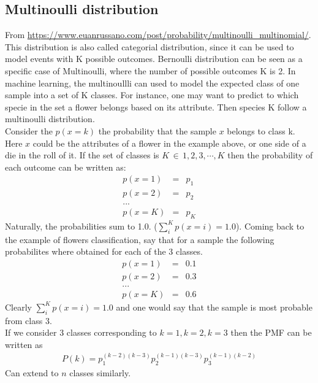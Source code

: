 \documentclass{article}
\newcommand{\ber}{\begin{eqnarray}}
\newcommand{\eer}{\end{eqnarray}}
\begin{document}
\subsection{Multinoulli distribution}
From \url{https://www.euanrussano.com/post/probability/multinoulli_multinomial/}.
This distribution is also called categorial distribution, since it can be used to model events with K possible outcomes. Bernoulli distribution can be seen as a specific case of Multinoulli, where the number of possible outcomes K is 2. In machine learning, the multinoullli can used to model the expected class of one sample into a set of K classes. For instance, one may want to predict to which specie  in the set  a flower belongs based on its attribute. Then species K follow a multinoulli distribution.\\
Consider the $p(x=k)$ the probability that the sample $x$ belongs to class k. Here  $x$ could be the attributes of a flower in the example above, or one side of a die in the roll of it. If the set of classes is $K \,\in \, 1,2,3,\cdots,K$ then the probability of each outcome can be written as:
\ber
p(x=1) &=& p_1\\
p(x=2) &=& p_2\\
... & &\\
p(x=K) &=& p_K
\eer
Naturally, the probabilities sum to 1.0. ($\sum_{i}^{K}p(x=i)=1.0$). Coming back to the example of flowers classification, say that for a sample  the following probabilites where obtained for each of the 3 classes.
\ber
p(x=1) &=& 0.1\\
p(x=2) &=& 0.3\\
... & &\\
p(x=K) &=& 0.6
\eer
Clearly $\sum_{i}^{K}p(x=i)=1.0$ and one would say that the sample is most probable from class 3.\\
If we consider 3 classes corresponding to $k=1,k=2,k=3$ then the PMF can be written as
\ber
P(k)=p_1^{(k-2)(k-3)}p_2^{(k-1)(k-3)}p_3^{(k-1)(k-2)}
\eer
Can extend to $n$ classes similarly.
\end{document}
